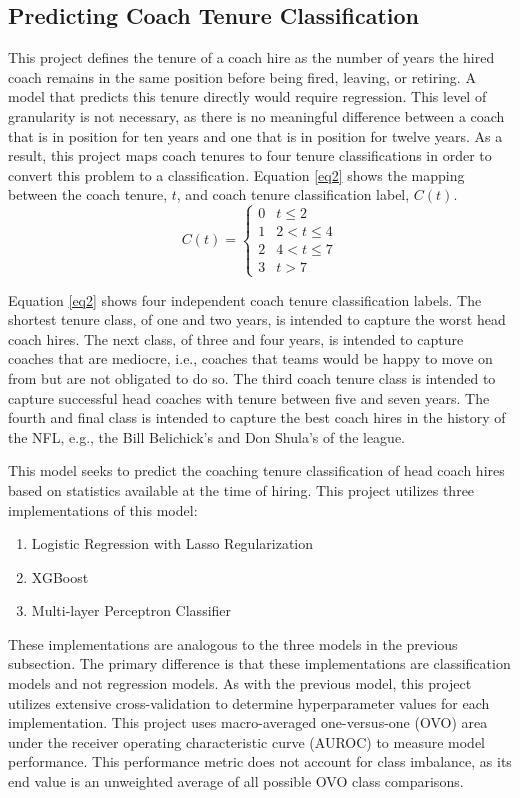 \documentclass[conference]{IEEEtran}
\begin{document}
\subsection{Predicting Coach Tenure Classification}
This project defines the tenure of a coach hire as the number of years the hired coach remains in the same position before being fired, leaving, or retiring. A model that predicts this tenure directly would require regression. This level of granularity is not necessary, as there is no meaningful difference between a coach that is in position for ten years and one that is in position for twelve years. As a result, this project maps coach tenures to four tenure classifications in order to convert this problem to a classification. Equation \eqref{eq2} shows the mapping between the coach tenure, $t$, and coach tenure classification label, $C(t)$.
\begin{equation}
        C(t)=
        \begin{cases}
            0 &t \leq 2 		\\
            1 &2 < t \leq 4 \\
            2 &4 < t \leq 7 \\
            3 &t > 7
        \end{cases}
        \label{eq2}
\end{equation}

Equation \eqref{eq2} shows four independent coach tenure classification labels. The shortest tenure class, of one and two years, is intended to capture the worst head coach hires. The next class, of three and four years, is intended to capture coaches that are mediocre, i.e., coaches that teams would be happy to move on from but are not obligated to do so. The third coach tenure class is intended to capture successful head coaches with tenure between five and seven years. The fourth and final class is intended to capture the best coach hires in the history of the NFL, e.g., the Bill Belichick's and Don Shula's of the league.

This model seeks to predict the coaching tenure classification of head coach hires based on statistics available at the time of hiring. This project utilizes three implementations of this model:
\begin{enumerate}
  \item Logistic Regression with Lasso Regularization\cite{b7}
  \item XGBoost\cite{b8}
  \item Multi-layer Perceptron Classifier\cite{b7}
\end{enumerate}
These implementations are analogous to the three models in the previous subsection. The primary difference is that these implementations are classification models and not regression models. As with the previous model, this project utilizes extensive cross-validation to determine hyperparameter values for each implementation. This project uses macro-averaged one-versus-one (OVO) area under the receiver operating characteristic curve (AUROC) to measure model performance. This performance metric does not account for class imbalance, as its end value is an unweighted average of all possible OVO class comparisons.
\end{document}
